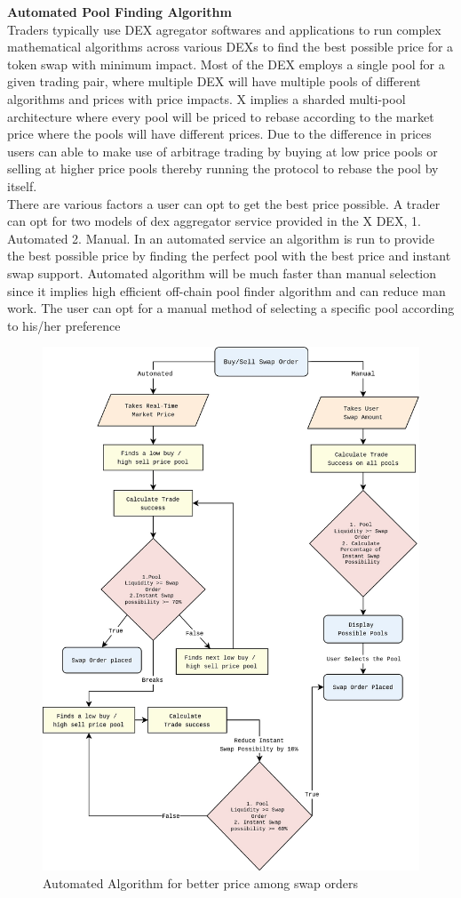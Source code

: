 \documentclass[letterpaper,11pt]{article}
\begin{document}
\textbf{Automated Pool Finding Algorithm}\\

Traders typically use DEX agregator softwares and applications to run complex mathematical algorithms across various DEXs to find the best possible price for a token swap with minimum impact. Most of the DEX employs a single pool for a given trading pair, where multiple DEX will have multiple pools of different algorithms and prices with price impacts. X implies a sharded multi-pool architecture where every pool will be priced to rebase according to the market price where the pools will have different prices. Due to the difference in prices users can able to make use of arbitrage trading by buying at low price pools or selling at higher price pools thereby running the protocol to rebase the pool by itself. \\

There are various factors a user can opt to get the best price possible. A trader can opt for two models of dex aggregator service provided in the X DEX, 1. Automated 2. Manual. In an automated service an algorithm is run to provide the best possible price by finding the perfect pool with the best price and instant swap support. Automated algorithm will be much faster than manual selection since it implies high efficient off-chain pool finder algorithm and can reduce man work. The user can opt for a manual method of selecting a specific pool according to his/her preference\\

\begin{figure}
\begin{center}
\includegraphics[width=11.5cm]{dex-algorithm}
\caption{Automated Algorithm for better price among swap orders}
\end{center}
\end{figure}
\end{document}
